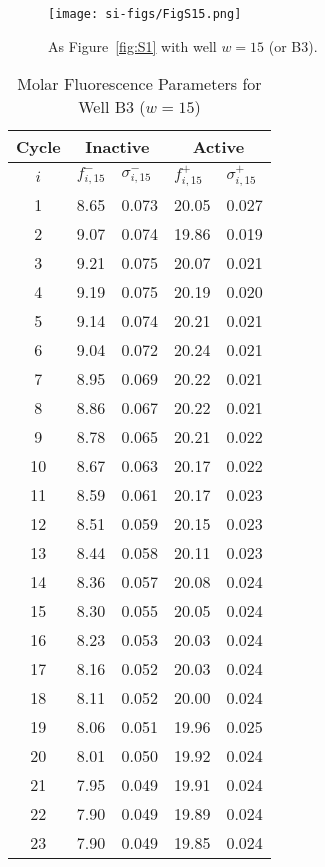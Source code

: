                 \begin{figure}
                    \centering
                    \texttt{[image: si-figs/FigS15.png]}
                    \caption{
                        As Figure~\ref{fig:S1} with well $w=15$ (or B3).
                    }
                \end{figure}
                \clearpage
    \begin{table}
        \caption{Molar Fluorescence Parameters for Well B3 ($w=15$)}
        \centering
        \begin{tabular}{c|ll|ll}
            Cycle & \multicolumn{2}{c|}{Inactive} & \multicolumn{2}{c}{Active} \\
            \hline
            $i$ & $f_{i,15}^{-}$ & $\sigma_{i,15}^{-}$ &  $f_{i,15}^{+}$ & $\sigma_{i,15}^{+}$ \\
            \hline
    1 & 8.65 & 0.073 & 20.05 & 0.027 \\
2 & 9.07 & 0.074 & 19.86 & 0.019 \\
3 & 9.21 & 0.075 & 20.07 & 0.021 \\
4 & 9.19 & 0.075 & 20.19 & 0.020 \\
5 & 9.14 & 0.074 & 20.21 & 0.021 \\
6 & 9.04 & 0.072 & 20.24 & 0.021 \\
7 & 8.95 & 0.069 & 20.22 & 0.021 \\
8 & 8.86 & 0.067 & 20.22 & 0.021 \\
9 & 8.78 & 0.065 & 20.21 & 0.022 \\
10 & 8.67 & 0.063 & 20.17 & 0.022 \\
11 & 8.59 & 0.061 & 20.17 & 0.023 \\
12 & 8.51 & 0.059 & 20.15 & 0.023 \\
13 & 8.44 & 0.058 & 20.11 & 0.023 \\
14 & 8.36 & 0.057 & 20.08 & 0.024 \\
15 & 8.30 & 0.055 & 20.05 & 0.024 \\
16 & 8.23 & 0.053 & 20.03 & 0.024 \\
17 & 8.16 & 0.052 & 20.03 & 0.024 \\
18 & 8.11 & 0.052 & 20.00 & 0.024 \\
19 & 8.06 & 0.051 & 19.96 & 0.025 \\
20 & 8.01 & 0.050 & 19.92 & 0.024 \\
21 & 7.95 & 0.049 & 19.91 & 0.024 \\
22 & 7.90 & 0.049 & 19.89 & 0.024 \\
23 & 7.90 & 0.049 & 19.85 & 0.024 \\

\end{tabular}
\end{table}
